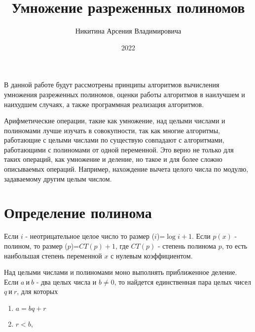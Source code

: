 \documentclass[bachelor, och, labwork]{shiza}
\begin{document}

\title{Умножение разреженных полиномов}





\author{Никитина Арсения Владимировича}



\date{2022}

\maketitle

\tableofcontents

\intro
В данной работе будут рассмотрены принципы алгоритмов вычисления умножения 
разреженных полиномов, оценки работы алгоритмов в наилучшем и наихудшем случаях,
а также программная реализация алгоритмов. 

Арифметические операции, такие как умножение, над целыми числами и полиномами
лучше изучать в совокупности, так как многие алгоритмы, работающие с целыми 
числами по существую совпадают с алгоритмами, работающими с полиномами от одной
переменной. Это верно не только для таких операций, как умножение и деление, но
такое и для более сложно описываемых операций. Например, нахождение вычета
целого числа по модулю, задаваемому другим целым числом.


\section{Определение полинома}

Если $i$ - неотрицательное целое число то размер ($i$)=$\log i+1$. Если $p(x)$
- полином, то размер ($p$)=$CT(p) + 1$, где $CT(p)$ - степень полинома $p$, то
есть наибольшая степень переменной $x$ с нулевым коэффициентом.

Над целыми числами и полиномами моно выполнять приближенное деление. Если 
$a ~\text{и}~ b$ - два целых числа и $b \not= 0$, то найдется единственная пара
целых чисел $q ~\text{и}~ r$, для которых
\begin{enumerate}
    \item $a=bq + r$
    \item $r<b$,
\end{enumerate}
\end{document}
